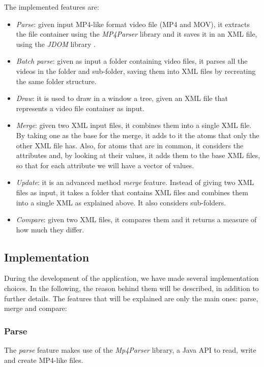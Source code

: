 The implemented features are:
\begin{itemize}
\item \emph{Parse}: given input MP4-like format video file (MP4 and MOV), it extracts the file container using the \emph{MP4Parser} library \cite{mp4parser} and it saves it in an XML file, using the \emph{JDOM} library \cite{jdom}.
\item \emph{Batch parse}: given as input a folder containing video files, it parses all the videos in the folder and sub-folder, saving them into XML files by recreating the same folder structure.
\item \emph{Draw}: it is used to draw in a window a tree, given an XML file that represents a video file container as input.
\item \emph{Merge}: given two XML input files, it combines them into a single XML file. By taking one as the base for the merge, it adds to it the atoms that only the other XML file has. Also, for atoms that are in common, it considers the attributes and, by looking at their values, it adds them to the base XML files, so that for each attribute we will have a vector of values.
\item \emph{Update}: it is an advanced method \emph{merge} feature. Instead of giving two XML files as input, it takes a folder that contains XML files and combines them into a single XML as explained above. It also considers sub-folders.
\item \emph{Compare}: given two XML files, it compares them and it returns a measure of how much they differ.
\end{itemize}

\subsection{Implementation} 
 
During the development of the application, we have made several implementation choices. In the following, the reason behind them will be described, in addition to further details. The features that will be explained are only the main ones: parse, merge and compare:

\subsubsection*{Parse}

The \emph{parse} feature makes use of the \emph{Mp4Parser} library, a Java API to read, write and create MP4-like files.

